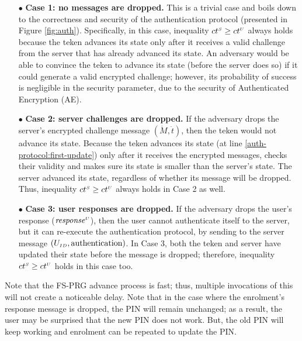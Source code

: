 \begin{itemize}
%
\item[$\bullet$] \textbf{Case 1: no messages are dropped.} This is a trivial case and boils down to the correctness and security of the authentication protocol  (presented in Figure \ref{fig:auth}). Specifically, in this case, inequality  ${ct}^{\scriptscriptstyle S} \geq {ct}^{\scriptscriptstyle U}$ always holds because the teken advances its state only after it receives a valid challenge from the server that has already advanced its state. An adversary would be able to convince the teken to advance its state (before the server does so) if it could generate a valid encrypted challenge; however, its probability of success is negligible in the security parameter, due to the security of Authenticated Encryption (AE). 
%
\item[$\bullet$] \textbf{Case 2: server challenges are dropped.} If the adversary drops the server's encrypted challenge message $(\ddot M, \ddot t)$, then the teken would not advance its state. Because the teken advances its state (at line \ref{auth-protocol:first-update}) only after it receives the encrypted messages, checks their validity and makes sure its state is smaller than the server's state. The server advanced its state, regardless of whether its message will be dropped. Thus, inequality  ${ct}^{\scriptscriptstyle S} \geq {ct}^{\scriptscriptstyle U}$ always holds in Case 2 as well. 
%
\item[$\bullet$] \textbf{Case 3: user responses are dropped.} If the adversary drops the user's response (\ie $\mathit{response}^{\scriptscriptstyle U}$), then the user cannot authenticate itself to the server, but it can re-execute the authentication protocol, by sending to the server message $(U_{\scriptscriptstyle ID}, \text{authentication})$. In Case 3, both the teken and server have updated their state before the message is dropped; therefore, inequality ${ct}^{\scriptscriptstyle S} \geq {ct}^{\scriptscriptstyle U}$  holds in this case too.   
%
\end{itemize}







Note that 
the FS-PRG advance process is fast; thus,  multiple invocations of this will not create a noticeable delay.
%
 Note that in the case where the enrolment's response message is dropped, the PIN will remain unchanged; as a result,  the user may be surprised that the new PIN does not work. But, the old PIN will keep working and enrolment can be repeated to update the PIN.
